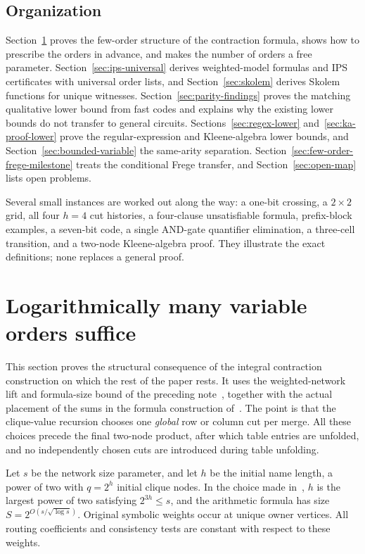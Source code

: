 \documentclass[11pt]{article}
\theoremstyle{definition}
\theoremstyle{remark}
\begin{document}
\subsection{Organization}

Section~\ref{sec:few-order} proves the few-order structure of the
contraction formula, shows how to prescribe the orders in advance, and
makes the number of orders a free parameter.
Section~\ref{sec:ips-universal} derives weighted-model formulas and IPS
certificates with universal order lists, and Section~\ref{sec:skolem}
derives Skolem functions for unique witnesses.
Section~\ref{sec:parity-findings} proves the matching qualitative lower
bound from fast codes and explains why the existing lower bounds do not
transfer to general circuits.
Sections~\ref{sec:regex-lower} and~\ref{sec:ka-proof-lower} prove the
regular-expression and Kleene-algebra lower bounds, and
Section~\ref{sec:bounded-variable} the same-arity separation.
Section~\ref{sec:few-order-frege-milestone} treats the conditional
Frege transfer, and Section~\ref{sec:open-map} lists open problems.

Several small instances are worked out along the way: a one-bit
crossing, a $2\times2$ grid, all four $h=4$ cut histories, a
four-clause unsatisfiable formula, prefix-block examples, a seven-bit
code, a single AND-gate quantifier elimination, a three-cell
transition, and a two-node Kleene-algebra proof. They illustrate the
exact definitions; none replaces a general proof.

\section{Logarithmically many variable orders suffice}
\label{sec:few-order}

This section proves the structural consequence of the integral
contraction construction on which the rest of the paper rests. It uses
the weighted-network lift and formula-size bound of the preceding
note~\cite{PreviousNote}, together with the actual placement of the
sums in the formula construction of~\cite{Cruz26}. The point is that
the clique-value recursion chooses one \emph{global} row or column cut
per merge. All these choices precede the final two-node product, after
which table entries are unfolded, and no independently chosen cuts are
introduced during table unfolding.

Let $s$ be the network size parameter, and let $h$ be the initial name
length, a power of two with $q=2^h$ initial clique nodes. In the choice
made in~\cite{Cruz26}, $h$ is the largest power of two satisfying
$2^{3h}\le s$, and the arithmetic formula has size
$S=2^{O(s/\sqrt{\log s})}$. Original symbolic weights occur at unique
owner vertices. All routing coefficients and consistency tests are
constant with respect to these weights.
\end{document}

